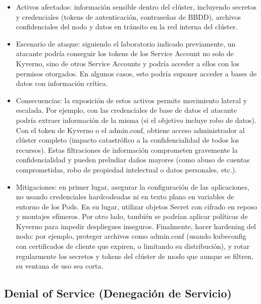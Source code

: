 \documentclass[12pt,twoside,titlepage]{report}
\begin{document}
\begin{itemize}
    \item Activos afectados: información sensible dentro del clúster, incluyendo secretos y credenciales (tokens de autenticación, contraseñas de BBDD), archivos confidenciales del nodo y datos en tránsito en la red interna del clúster.
    \item Escenario de ataque: siguiendo el laboratorio indicado previamente, un atacante podría conseguir los tokens de los Service Account no solo de Kyverno, sino de otros Service Accounts y podría acceder a ellos con los permisos otorgados. En algunos casos, esto podría suponer acceder a bases de datos con información crítica.
    \item Consecuencias: la exposición de estos activos permite movimiento lateral y escalada. Por ejemplo, con las credenciales de base de datos el atacante podría extraer información de la misma (si el objetivo incluye robo de datos). Con el token de Kyverno o el admin.conf, obtiene acceso administrador al clúster completo (impacto catastrófico a la confidencialidad de todos los recursos). Estas filtraciones de información comprometen gravemente la confidencialidad y pueden preludiar daños mayores (como abuso de cuentas comprometidas, robo de propiedad intelectual o datos personales, etc.).
    \item Mitigaciones: en primer lugar, asegurar la configuración de las aplicaciones, no usando credenciales hardcodeadas ni en texto plano en variables de entorno de los Pods. En su lugar, utilizar objetos Secret con cifrado en reposo y montajes efímeros. Por otro lado, también se podrían aplicar políticas de Kyverno para impedir despliegues inseguros. Finalmente, hacer hardening del nodo: por ejemplo, proteger archivos como admin.conf (usando kubeconfig con certificados de cliente que expiren, o limitando su distribución), y rotar regularmente los secretos y tokens del clúster de modo que aunque se filtren, su ventana de uso sea corta.
\end{itemize}

\subsection{Denial of Service (Denegación de Servicio)}
\end{document}
